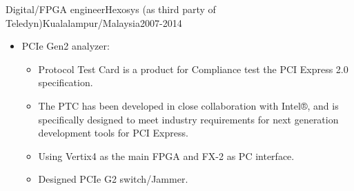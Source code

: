 \documentclass[10pt, a4paper]{article}
\begin{document}
\begin{cvitem}{Digital/FPGA engineer}{Hexosys {(as third party of Teledyn)}}{Kualalampur/Malaysia}{2007-2014}
\begin{itemize}
\begin{itemize}
        \end{itemize}
        \item PCIe Gen2 analyzer:
        \begin{itemize}
            \item Protocol Test Card is a product for Compliance test the PCI Express 2.0 specification.
            \item The PTC has been developed in close collaboration with Intel®, and is specifically designed to meet industry requirements for next generation development tools for PCI Express.
            \item Using Vertix4 as the main FPGA and FX-2 as PC interface.
            \item Designed PCIe G2 switch/Jammer.
        \end{itemize}
    \end{itemize}
\end{cvitem}
\end{document}
